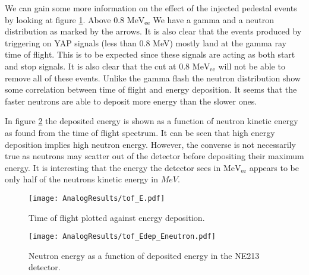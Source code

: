 \documentclass[main.tex]{subfiles}
\begin{document}
We can gain some more information on the effect of the injected pedestal events by looking at figure \ref{fig:tof_E_a}. Above 0.8 $\text{MeV}_\text{ee}$ We have a gamma and a neutron distribution as marked by the arrows. It is also clear that the events produced by triggering on YAP signals (less than 0.8 MeV) mostly land at the gamma ray time of flight. This is to be expected since these signals are acting as both start and stop signals. It is also clear that the cut at 0.8 $\text{MeV}_\text{ee}$ will not be able to remove all of these events. Unlike the gamma flash the neutron distribution show some correlation between time of flight and energy deposition. It seems that the faster neutrons are able to deposit more energy than the slower ones.

In figure \ref{fig:tof_Edep_Eneutron_a} the deposited energy is shown as a function of neutron kinetic energy as found from the time of flight spectrum. It can be seen that high energy deposition implies high neutron energy. However, the converse is not necessarily true as neutrons may scatter out of the detector before depositing their maximum energy. It is interesting that the energy the detector sees in $\text{MeV}_\text{ee}$ appears to be only half of the neutrons kinetic energy in  $MeV$.

\begin{figure}[ht]
    \centering
        \texttt{[image: AnalogResults/tof\_E.pdf]}
        \caption{Time of flight plotted against energy deposition.}
    \label{fig:tof_E_a} 
\end{figure}

\begin{figure}[ht]
    \centering
        \texttt{[image: AnalogResults/tof\_Edep\_Eneutron.pdf]}
        \caption{Neutron energy as a function of deposited energy in the NE213 detector.}
    \label{fig:tof_Edep_Eneutron_a} 
\end{figure}
\end{document}

